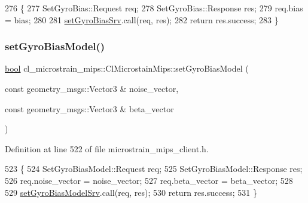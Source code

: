 \begin{DoxyCode}
276     \{
277         SetGyroBias::Request req;
278         SetGyroBias::Response res;
279         req.bias = bias;
280 
281         \hyperlink{classcl__microstrain__mips_1_1ClMicrostainMips_a29fcea0897ca3bd7a036ab5c1856b86c}{setGyroBiasSrv}.call(req, res);
282         \textcolor{keywordflow}{return} res.success;
283     \}
\end{DoxyCode}
\mbox{\label{classcl__microstrain__mips_1_1ClMicrostainMips_ac0a42062a2938fca9c982668909f7bff}} 
\subsubsection{\texorpdfstring{set\+Gyro\+Bias\+Model()}{setGyroBiasModel()}}
{\footnotesize\ttfamily \hyperlink{classbool}{bool} cl\+\_\+microstrain\+\_\+mips\+::\+Cl\+Microstain\+Mips\+::set\+Gyro\+Bias\+Model (\begin{DoxyParamCaption}\item[{const geometry\+\_\+msgs\+::\+Vector3 \&}]{noise\+\_\+vector,  }\item[{const geometry\+\_\+msgs\+::\+Vector3 \&}]{beta\+\_\+vector }\end{DoxyParamCaption})\hspace{0.3cm}{\ttfamily [inline]}}



Definition at line 522 of file microstrain\+\_\+mips\+\_\+client.\+h.


\begin{DoxyCode}
523     \{
524         SetGyroBiasModel::Request req;
525         SetGyroBiasModel::Response res;
526         req.noise\_vector = noise\_vector;
527         req.beta\_vector = beta\_vector;
528 
529         \hyperlink{classcl__microstrain__mips_1_1ClMicrostainMips_a96fa3777b87a5d8abcb0f5fe6d740934}{setGyroBiasModelSrv}.call(req, res);
530         \textcolor{keywordflow}{return} res.success;
531     \}
\end{DoxyCode}
\mbox{\label{classcl__microstrain__mips_1_1ClMicrostainMips_a26f7969c967cc7f83f556f566254e0ff}} 
